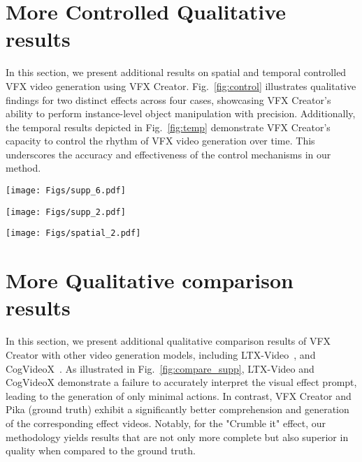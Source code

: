 \section{More Controlled Qualitative results }
In this section, we present additional results on spatial and temporal controlled VFX video generation using VFX Creator. Fig.~\ref{fig:control} illustrates qualitative findings for two distinct effects across four cases, showcasing VFX Creator's ability to perform instance-level object manipulation with precision. Additionally, the temporal results depicted in Fig.~\ref{fig:temp} demonstrate VFX Creator's capacity to control the rhythm of VFX video generation over time. This underscores the accuracy and effectiveness of the control mechanisms in our method.
\begin{figure*}[htbp]
    \centering
    \texttt{[image: Figs/supp\_6.pdf]}  %
    \caption{More spatial controlled VFX generation results of our method on two different visual effects.}
    \label{fig:control}
\end{figure*}
\begin{figure*}[htbp]
    \centering
    \texttt{[image: Figs/supp\_2.pdf]}  %
    \caption{More qualitative comparison results of VFX video generation on two different visual effects between our method, DynamiCrafter, LTX-Video, CogVideoX-5B, and Pika.}
    \label{fig:compare_supp}
\end{figure*}
\begin{figure*}[htbp]
    \centering
    \texttt{[image: Figs/spatial\_2.pdf]}  %
    \caption{More temporal controlled VFX generation results of our method.}
    \label{fig:temp}
\end{figure*}
\section{More Qualitative comparison results}
In this section, we present additional qualitative comparison results of VFX Creator with other video generation models, including LTX-Video~\cite{hacohen2024ltx}, and CogVideoX~\cite{yang2024cogvideox}. As illustrated in Fig.~\ref{fig:compare_supp}, LTX-Video and CogVideoX demonstrate a failure to accurately interpret the visual effect prompt, leading to the generation of only minimal actions. In contrast, VFX Creator and Pika (ground truth) exhibit a significantly better comprehension and generation of the corresponding effect videos. Notably, for the "Crumble it" effect, our methodology yields results that are not only more complete but also superior in quality when compared to the ground truth.
